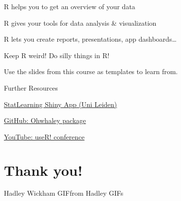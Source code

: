 \documentclass[
]{book}
\begin{document}
R helps you to get an overview of your data

R gives your tools for data analysis \& visualization

R lets you create reports, presentations, app dashboards\ldots{}

Keep R weird! Do silly things in R!

Use the slides from this course as templates to learn from.

Further Resources

\href{https://solo-fsw.shinyapps.io/NewStatLearning/}{StatLearning Shiny App (Uni Leiden)}

\href{https://github.com/fontikar/ohwhaley}{GitHub: Ohwhaley package}

\href{https://www.youtube.com/@useRConference_global}{YouTube: useR! conference}

\section{Thank you!}\label{thank-you-5}

Hadley Wickham GIFfrom Hadley GIFs

  
\end{document}

